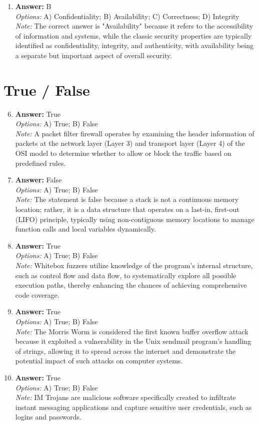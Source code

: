 \documentclass[12pt]{article}
\begin{document}
\begin{enumerate}[label=\arabic*.]
\item \textbf{Answer:} B
\\ \textit{Options:} A) Confidentiality; B) Availability; C) Correctness; D) Integrity
\\ \textit{Note:} The correct answer is "Availability" because it refers to the accessibility of information and systems, while the classic security properties are typically identified as confidentiality, integrity, and authenticity, with availability being a separate but important aspect of overall security.
\end{enumerate}

\section*{True / False}
\begin{enumerate}[label=\arabic*.]
\setcounter{enumi}{5}
\item \textbf{Answer:} True
\\ \textit{Options:} A) True; B) False
\\ \textit{Note:} A packet filter firewall operates by examining the header information of packets at the network layer (Layer 3) and transport layer (Layer 4) of the OSI model to determine whether to allow or block the traffic based on predefined rules.
\item \textbf{Answer:} False
\\ \textit{Options:} A) True; B) False
\\ \textit{Note:} The statement is false because a stack is not a continuous memory location; rather, it is a data structure that operates on a last-in, first-out (LIFO) principle, typically using non-contiguous memory locations to manage function calls and local variables dynamically.
\item \textbf{Answer:} True
\\ \textit{Options:} A) True; B) False
\\ \textit{Note:} Whitebox fuzzers utilize knowledge of the program's internal structure, such as control flow and data flow, to systematically explore all possible execution paths, thereby enhancing the chances of achieving comprehensive code coverage.
\item \textbf{Answer:} True
\\ \textit{Options:} A) True; B) False
\\ \textit{Note:} The Morris Worm is considered the first known buffer overflow attack because it exploited a vulnerability in the Unix sendmail program's handling of strings, allowing it to spread across the internet and demonstrate the potential impact of such attacks on computer systems.
\item \textbf{Answer:} True
\\ \textit{Options:} A) True; B) False
\\ \textit{Note:} IM Trojans are malicious software specifically created to infiltrate instant messaging applications and capture sensitive user credentials, such as logins and passwords.
\end{enumerate}
\end{document}

